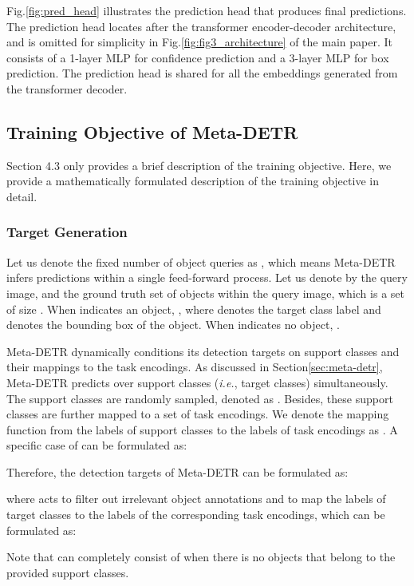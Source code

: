 \documentclass[letterpaper]{article} \usepackage{aaai22}  \usepackage{times}  \usepackage{helvet}  \usepackage{courier}  \usepackage[hyphens]{url}  \usepackage{graphicx} \urlstyle{rm} \def\UrlFont{\rm}  \usepackage{natbib}  \usepackage{caption} \DeclareCaptionStyle{ruled}{labelfont=normalfont,labelsep=colon,strut=off} \frenchspacing  \setlength{\pdfpagewidth}{8.5in}  \setlength{\pdfpageheight}{11in}  \usepackage{algorithm}
\begin{document}
Fig.\;\ref{fig:pred_head} illustrates the prediction head that produces final predictions. The prediction head locates after the transformer encoder-decoder architecture, and is omitted for simplicity in Fig.\;\ref{fig:fig3_architecture} of the main paper. It consists of a 1-layer MLP for confidence prediction and a 3-layer MLP for box prediction. The prediction head is shared for all the embeddings generated from the transformer decoder.


\subsection{Training Objective of Meta-DETR}

Section 4.3 only provides a brief description of the training objective. Here, we provide a mathematically formulated description of the training objective in detail.

\subsubsection{Target Generation}
Let us denote the fixed number of object queries as , which means Meta-DETR infers  predictions within a single feed-forward process. Let us denote by  the query image, and  the ground truth set of objects within the query image, which is a set of size . When  indicates an object, , where  denotes the target class label and  denotes the bounding box of the object. When  indicates no object, .

Meta-DETR dynamically conditions its detection targets on support classes and their mappings to the task encodings. As discussed in Section\;\ref{sec:meta-detr}, Meta-DETR predicts over  support classes (\textit{i.e.}, target classes) simultaneously. The  support classes are randomly sampled, denoted as . Besides, these support classes are further mapped to a set of task encodings. We denote the mapping function from the labels of support classes to the labels of task encodings as . A specific case of  can be formulated as:

Therefore, the detection targets of Meta-DETR can be formulated as:

where  acts to filter out irrelevant object annotations and to map the labels of target classes to the labels of the corresponding task encodings, which can be formulated as:

Note that  can completely consist of  when there is no objects that belong to the provided support classes.
\end{document}
